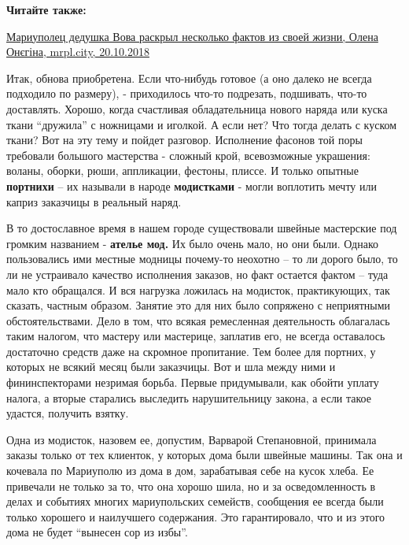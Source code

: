 \textbf{Читайте также:} 

\href{https://mrpl.city/news/view/mariupolets-dedushka-vova-raskryl-neskolko-faktov-iz-svoej-zhizni-video}{%
Мариуполец дедушка Вова раскрыл несколько фактов из своей жизни, Олена Онєгіна, mrpl.city, 20.10.2018}

Итак, обнова приобретена. Если что-нибудь готовое (а оно далеко не всегда
подходило по размеру), - приходилось что-то подрезать, подшивать, что-то
доставлять. Хорошо, когда счастливая обладательница нового наряда  или куска
ткани \enquote{дружила} с ножницами и иголкой. А если нет? Что тогда делать с куском
ткани? Вот на эту тему и пойдет разговор. Исполнение фасонов той поры требовали
большого мастерства -  сложный крой, всевозможные украшения: воланы, оборки,
рюши, аппликации, фестоны, плиссе. И только опытные \textbf{портнихи} – их называли в
народе \textbf{модистками} - могли воплотить мечту или каприз заказчицы в реальный
наряд.


В то достославное время в нашем городе существовали швейные мастерские под
громким названием - \textbf{ателье мод.} Их было очень мало, но они были. Однако
пользовались ими местные модницы почему-то неохотно – то ли дорого было, то ли
не устраивало качество исполнения заказов, но факт остается фактом – туда мало
кто обращался. И вся нагрузка ложилась на модисток, практикующих, так сказать,
частным образом. Занятие это для них было сопряжено с неприятными
обстоятельствами. Дело в том, что всякая ремесленная деятельность облагалась
таким налогом, что мастеру или мастерице, заплатив его, не всегда оставалось
достаточно средств даже на скромное пропитание. Тем более для портних, у
которых не всякий месяц были заказчицы. Вот и шла между ними и фининспекторами
незримая борьба. Первые придумывали, как обойти уплату налога, а вторые
старались выследить нарушительницу закона, а если такое удастся, получить
взятку.

Одна из модисток, назовем ее, допустим, Варварой Степановной, принимала заказы
только от тех клиенток, у которых дома были швейные машины. Так она и кочевала
по Мариуполю из дома в дом, зарабатывая себе на кусок хлеба. Ее привечали не
только за то, что она хорошо шила, но и за осведомленность в делах и событиях
многих мариупольских семейств, сообщения ее всегда были только хорошего и
наилучшего содержания. Это гарантировало, что и из этого дома не будет \enquote{вынесен
сор из избы}.

